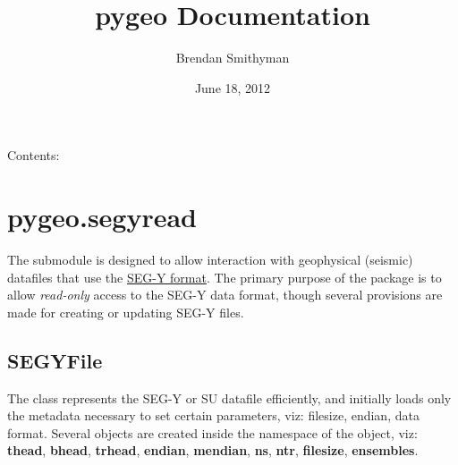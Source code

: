 \documentclass[letterpaper,10pt,english]{sphinxmanual}
\title{pygeo Documentation}
\date{June 18, 2012}
\author{Brendan Smithyman}
\begin{document}
\maketitle
\tableofcontents
{}\label{index::doc}


Contents:


\chapter{pygeo.segyread}
\label{segyread:welcome-to-pygeo-s-documentation}\label{segyread:pygeo-segyread}\label{segyread::doc}
The {\hyperref[segyread:module-pygeo.segyread]{}} submodule is designed to allow interaction with geophysical (seismic) datafiles that use the \href{http://en.wikipedia.org/wiki/SEG-Y}{SEG-Y format}.  The primary purpose of the package is to allow \emph{read-only} access to the SEG-Y data format, though several provisions are made for creating or updating SEG-Y files.
\label{segyread:module-pygeo.segyread}\label{segyread:module-pygeo.segyread}

\section{SEGYFile}
\label{segyread:segyfile}
The  {\hyperref[segyread:pygeo.segyread.SEGYFile]{}} class represents the SEG-Y or SU datafile efficiently, and initially loads only the metadata necessary to set certain parameters, viz: filesize, endian, data format.  Several objects are created inside the namespace of the {\hyperref[segyread:pygeo.segyread.SEGYFile]{}} object, viz: \textbf{thead}, \textbf{bhead}, \textbf{trhead}, \textbf{endian}, \textbf{mendian}, \textbf{ns}, \textbf{ntr}, \textbf{filesize}, \textbf{ensembles}.
\end{document}
